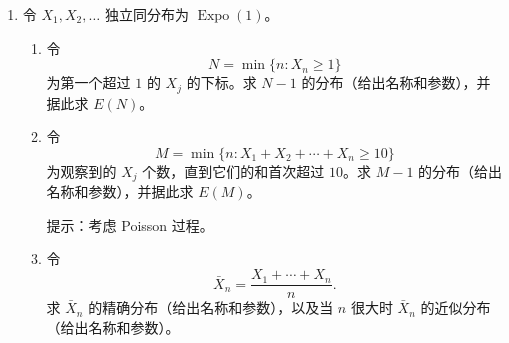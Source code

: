 \documentclass[UTF8,12pt,a4paper,fontset=fandol]{ctexart}
\begin{document}
\begin{enumerate}
\begin{enumerate}
    提示：考虑
    \[
      \frac{X_1}{X_1+\cdots+X_n}
      +\frac{X_2}{X_1+\cdots+X_n}
      +\cdots+
      \frac{X_n}{X_1+\cdots+X_n}.
    \]
    \item 当 $n\to\infty$ 时，$nW_n$ 以概率 $1$ 收敛到哪个随机变量？
    \item 若 $X_j\sim\operatorname{Expo}(\lambda)$，求 $W_n$ 的分布，最好不用微积分。（若它是本书中学过的命名分布之一，请给出名称并说明参数；否则给出 PDF。）
  \end{enumerate}

  \item 令 $X_1,X_2,\ldots$ 独立同分布为 $\operatorname{Expo}(1)$。
  \begin{enumerate}
    \item 令
    \[
      N=\min\{n:X_n\ge 1\}
    \]
    为第一个超过 $1$ 的 $X_j$ 的下标。求 $N-1$ 的分布（给出名称和参数），并据此求 $E(N)$。
    \item 令
    \[
      M=\min\{n:X_1+X_2+\cdots+X_n\ge 10\}
    \]
    为观察到的 $X_j$ 个数，直到它们的和首次超过 $10$。求 $M-1$ 的分布（给出名称和参数），并据此求 $E(M)$。

    提示：考虑 Poisson 过程。
    \item 令
    \[
      \bar X_n=\frac{X_1+\cdots+X_n}{n}.
    \]
    求 $\bar X_n$ 的精确分布（给出名称和参数），以及当 $n$ 很大时 $\bar X_n$ 的近似分布（给出名称和参数）。
  \end{enumerate}
\end{enumerate}
\end{document}
